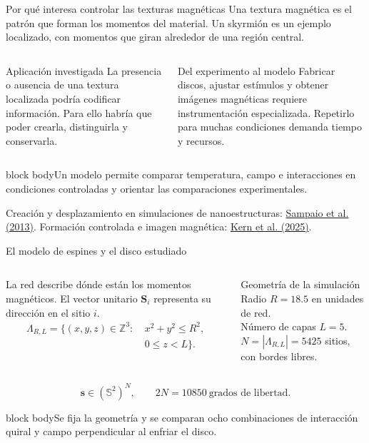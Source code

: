 \documentclass[aspectratio=169,10pt]{beamer}
\newcommand{\idea}[1]{\vspace{2pt}\begin{beamercolorbox}[rounded=true,sep=5pt,wd=\linewidth]{block body}\small #1\end{beamercolorbox}}
\newcommand{\fuente}[1]{{\fontsize{6.5}{8}\selectfont\color{black!60}#1\par}}
\begin{document}
\begin{frame}{Por qué interesa controlar las texturas magnéticas}
\small Una textura magnética es el patrón que forman los momentos del material. Un skyrmión es un ejemplo localizado, con momentos que giran alrededor de una región central.
\begin{columns}[T,onlytextwidth]
\begin{block}{Aplicación investigada}
La presencia o ausencia de una textura localizada podría codificar información. Para ello habría que poder crearla, distinguirla y conservarla.
\end{block}
\begin{block}{Del experimento al modelo}
Fabricar discos, ajustar estímulos y obtener imágenes magnéticas requiere instrumentación especializada. Repetirlo para muchas condiciones demanda tiempo y recursos.
\end{block}
\end{columns}
\idea{Un modelo permite comparar temperatura, campo e interacciones en condiciones controladas y orientar las comparaciones experimentales.}
\fuente{Creación y desplazamiento en simulaciones de nanoestructuras: \href{https://doi.org/10.1038/nnano.2013.210}{Sampaio et al. (2013)}. Formación controlada e imagen magnética: \href{https://doi.org/10.1002/adma.202501250}{Kern et al. (2025)}.}
\end{frame}

\begin{frame}{El modelo de espines y el disco estudiado}
\begin{columns}[T,onlytextwidth]
La red describe dónde están los momentos magnéticos. El vector unitario $\mathbf S_i$ representa su dirección en el sitio $i$.
\[
\begin{aligned}
\Lambda_{R,L}=\{(x,y,z)\in\mathbb Z^3:\ &x^2+y^2\le R^2,\\[-1pt]
&0\le z<L\}.
\end{aligned}
\]
\begin{block}{Geometría de la simulación}
Radio $R=18.5$ en unidades de red.\\
Número de capas $L=5$.\\
$N=|\Lambda_{R,L}|=5425$ sitios, con bordes libres.
\end{block}
\end{columns}
\[
\mathbf s\in(\mathbb S^2)^N,\qquad 2N=10850\ \text{grados de libertad}.
\]
\idea{Se fija la geometría y se comparan ocho combinaciones de interacción quiral y campo perpendicular al enfriar el disco.}
\end{frame}
\end{document}
